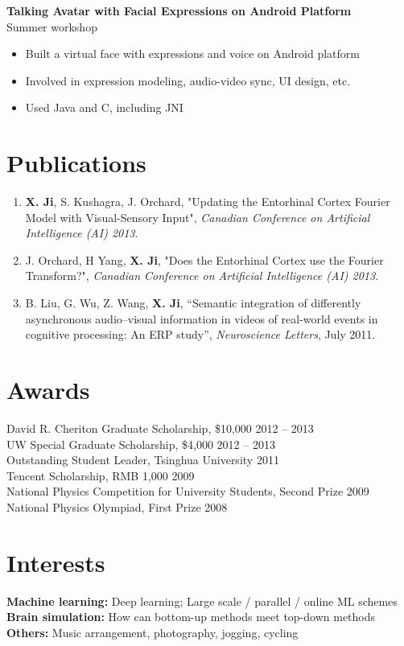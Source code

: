 \documentclass[margin]{res}
\begin{document}
\begin{resume}
 {\bf Talking Avatar with Facial Expressions on Android Platform}\\
 Summer workshop
  \begin{itemize} \itemsep -2pt
   \item Built a virtual face with expressions and voice on Android platform
   \item Involved in expression modeling, audio-video sync, UI design, etc.
   \item Used Java and C, including JNI
 \end{itemize}



\section{Publications} 

 \begin{enumerate} \itemsep -2pt
\item {\bf X. Ji}, S. Kushagra, J. Orchard, "Updating the Entorhinal Cortex Fourier Model with Visual-Sensory Input", {\em Canadian Conference on Artificial Intelligence (AI) 2013}.
\item J. Orchard, H Yang, {\bf X. Ji}, "Does the Entorhinal Cortex use the Fourier Transform?",  {\em Canadian Conference on Artificial Intelligence (AI) 2013}.
\item B. Liu, G. Wu, Z. Wang, {\bf X. Ji}, ``Semantic integration of differently asynchronous audio–visual information in videos of real-world events in cognitive processing: An ERP study'', {\em Neuroscience Letters}, July 2011. 
\end{enumerate}


\section{Awards}

David R. Cheriton Graduate Scholarship, \$10,000 \hfill 2012 -- 2013\\
UW Special Graduate Scholarship, \$4,000 \hfill 2012 -- 2013\\
Outstanding Student Leader, Tsinghua University \hfill 2011\\
Tencent Scholarship, RMB 1,000 \hfill 2009\\
National Physics Competition for University Students, Second Prize \hfill 2009\\
National Physics Olympiad, First Prize \hfill 2008\\



\section{Interests}
{\bf Machine learning:} Deep learning; Large scale / parallel / online ML schemes\\
{\bf Brain simulation:} How can bottom-up methods meet top-down methods\\
{\bf Others:} Music arrangement, photography, jogging, cycling\\

\end{resume} 
\end{document}
